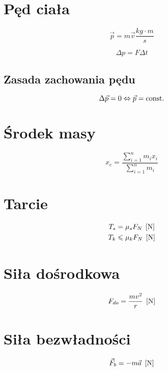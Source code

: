
\section{Pęd ciała}
\begin{equation}
  \vec p = m \vec v \unit{\frac{kg\cdot m}{s}}
\end{equation}

\begin{equation*}
  \Delta p = F \Delta t
\end{equation*}

\subsection{Zasada zachowania pędu}
\begin{equation*}
  \Delta \vec p = 0 \Leftrightarrow \vec p = \operatorname{const.}
\end{equation*}

\section{Środek masy}
\begin{equation*}
  x_c = \frac{\sum_{i=1}^n m_i x_i}{\sum_{i=1}^n m_i}
\end{equation*}

\section{Tarcie}
\begin{align*}
  T_s &= \mu_s F_N \;\left[\mathrm{N}\right]\\
  T_k &\leqslant \mu_k F_N \;\left[\mathrm{N}\right]
\end{align*}

\section{Siła dośrodkowa}
\begin{equation*}
  F_{do} = \frac{mv^2}{r} \;\left[\mathrm{N}\right]
\end{equation*}

\section{Siła bezwładności}
\begin{equation*}
  \vec F_b = -m \vec a \;\left[\mathrm{N}\right]
\end{equation*}
